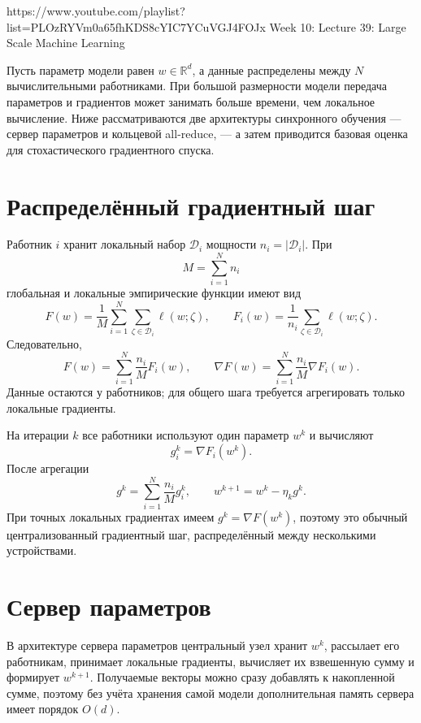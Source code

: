 
\sourcevideo
    {https://www.youtube.com/playlist?list=PLOzRYVm0a65fhKDS8cYIC7YCuVGJ4FOJx}
    {Week 10: Lecture 39: Large Scale Machine Learning}

Пусть параметр модели равен \(w\in\mathbb R^d\), а данные распределены
между \(N\) вычислительными работниками. При большой размерности
модели передача параметров и градиентов может занимать больше времени,
чем локальное вычисление. Ниже рассматриваются две архитектуры
синхронного обучения --- сервер параметров и кольцевой all-reduce, ---
а затем приводится базовая оценка для стохастического градиентного
спуска.

\section{Распределённый градиентный шаг}

Работник \(i\) хранит локальный набор \(\mathcal D_i\) мощности
\(n_i=\lvert\mathcal D_i\rvert\). При
\[
    M=\sum_{i=1}^{N}n_i
\]
глобальная и локальные эмпирические функции имеют вид
\[
    F(w)
    =
    \frac1M
    \sum_{i=1}^{N}
    \sum_{\zeta\in\mathcal D_i}
    \ell(w;\zeta),
    \qquad
    F_i(w)
    =
    \frac1{n_i}
    \sum_{\zeta\in\mathcal D_i}
    \ell(w;\zeta).
\]
Следовательно,
\[
    F(w)
    =
    \sum_{i=1}^{N}\frac{n_i}{M}F_i(w),
    \qquad
    \nabla F(w)
    =
    \sum_{i=1}^{N}\frac{n_i}{M}\nabla F_i(w).
\]
Данные остаются у работников; для общего шага требуется агрегировать
только локальные градиенты.

На итерации \(k\) все работники используют один параметр \(w^k\) и
вычисляют
\[
    g_i^k=\nabla F_i(w^k).
\]
После агрегации
\[
    g^k
    =
    \sum_{i=1}^{N}\frac{n_i}{M}g_i^k,
    \qquad
    w^{k+1}=w^k-\eta_k g^k.
\]
При точных локальных градиентах имеем \(g^k=\nabla F(w^k)\), поэтому
это обычный централизованный градиентный шаг, распределённый между
несколькими устройствами.

\section{Сервер параметров}

В архитектуре сервера параметров центральный узел хранит \(w^k\),
рассылает его работникам, принимает локальные градиенты, вычисляет их
взвешенную сумму и формирует \(w^{k+1}\). Получаемые векторы можно
сразу добавлять к накопленной сумме, поэтому без учёта хранения самой
модели дополнительная память сервера имеет порядок \(O(d)\).

